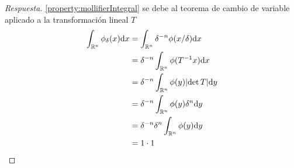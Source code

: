 \documentclass{article}
\newcommand{\realNumbers}{\mathbb{R}}
\theoremstyle{remark}
\begin{document}
\begin{proof}[Respuesta]
  \ref{property:mollifierIntegral}
  se debe al teorema de cambio de variable aplicado a la transformación lineal \(T\)
  \begin{align}
    \int_{\realNumbers^n} \phi_{\delta}(x) \dd x
    &=
    \int_{\realNumbers^n} \delta^{- n} \phi(x / \delta) \dd x
    \\
    &=
    \delta^{- n}
    \int_{\realNumbers^n}\phi(T^{- 1} x) \dd x
    \\
    &=
    \delta^{- n}
    \int_{\realNumbers^n}\phi(y) \abs{\det T} \dd y
    \\
    &=
    \delta^{- n}
    \int_{\realNumbers^n}\phi(y) \delta^n \dd y
    \\
    &=
    \delta^{- n} \delta^n 
    \int_{\realNumbers^n}\phi(y) \dd y
    \\
    &=
    1 
    \cdot 1
  \end{align}
  
\end{proof}
\end{document}
